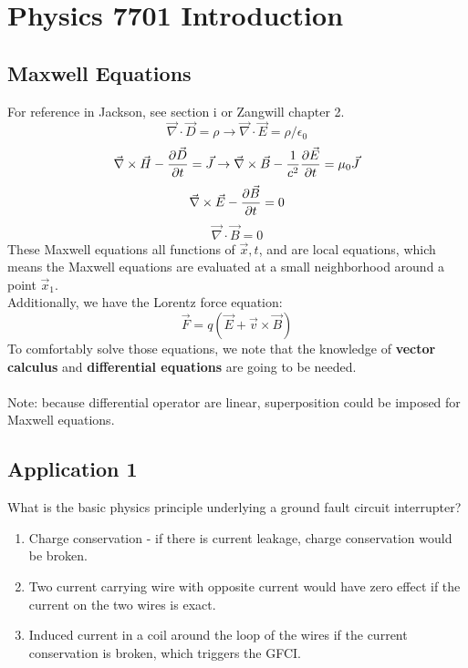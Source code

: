 \documentclass{article}
\begin{document}
\section*{Physics 7701 Introduction}
\subsection*{Maxwell Equations}
For reference in Jackson, see section i or Zangwill chapter 2. \\ 

\begin{equation*}
\vec{\nabla} \cdot  \vec{D} = \rho \to \vec{\nabla} \cdot \vec{E} = \rho /\epsilon_0  
\end{equation*}
\begin{equation*}
  \vec{\nabla} \times   \vec{H}  - \pdv{\vec{D} }{t}= \vec{J}  \to \vec{\nabla} \times  \vec{B} - \frac{1}{c^2} \pdv{\vec{E} }{t} = \mu_0 \vec{J}    
\end{equation*}
\begin{equation*}
  \vec{\nabla} \times   \vec{E}  - \pdv{\vec{B} }{t}= 0
\end{equation*}
\begin{equation*}
\vec{\nabla} \cdot  \vec{B} = 0
\end{equation*}
These Maxwell equations  all functions of $\vec{x} ,t$, and are local equations, which means the Maxwell equations are evaluated at a small neighborhood around a point $\vec{x}_1$. \\ 
Additionally, we have the Lorentz force equation:
\begin{equation*}
\vec{F} = q (\vec{E} + \vec{v} \times \vec{B})
\end{equation*}
To comfortably solve those equations, we note that the knowledge of \textbf{vector calculus} and \textbf{differential equations} are going to be needed.  \\
\\ 
Note: because differential operator are linear, superposition could be imposed for Maxwell equations.

\subsection*{Application 1}
What is the basic physics principle underlying a ground fault circuit interrupter?
\begin{enumerate}
  \item Charge conservation - if there is current leakage, charge conservation would be broken.
  \item Two current carrying wire with opposite current would have zero effect if the current on the two wires is exact.
  \item Induced current in a coil around the loop of the wires if the current conservation is broken, which triggers the GFCI.
\end{enumerate}
\end{document}
